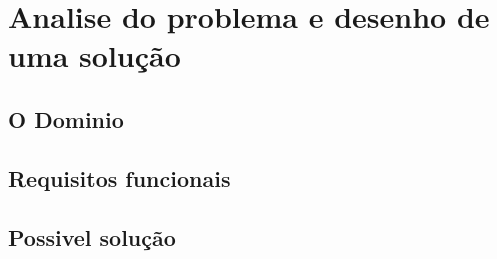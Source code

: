 \chapter{Analise do problema e desenho de uma solução}
\label{chap:analisedoproblema}

\section{O Dominio}



\section{Requisitos funcionais}



\section{Possivel solução}